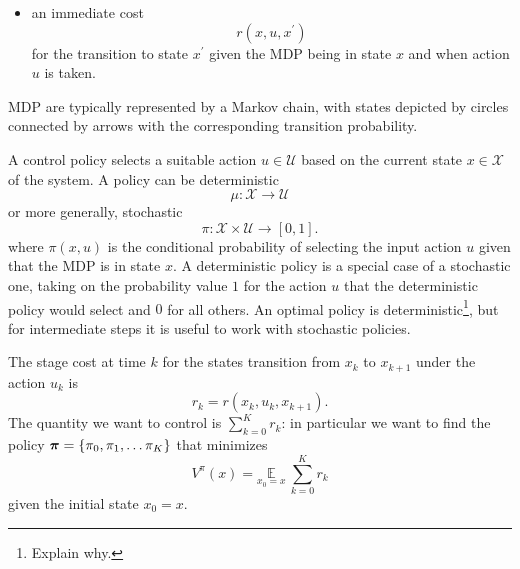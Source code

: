 \begin{itemize}
{    highlighting the quantity $r+\gamma V^\pi(x^\prime)$ similar to that in use in RL.}
  \begin{equation*}
    P : \mathcal{X}\times \mathcal{X}\times \mathcal{U} \rightarrow [0,1]
  \end{equation*}
  where
  \begin{equation*}
    P^u_{x,x^\prime} = \mathbb{P}[x^\prime |x,u]
  \end{equation*}
  is the \emph{probability} to transition to state $x^\prime$ if the MDP is in state $x$ and the input $u$ is applied. The Markov property for probabilistic systems is the extension of the definition for deterministic systems: for every $x^\prime$, the probability $P^u_{x,x\prime}$ depends only on $x$ and $u$ and not on the past system history;
\item an immediate cost
  \begin{equation*}
    r(x,u,x^\prime)
  \end{equation*}
  for the transition to state $x^\prime$ given the MDP being in state $x$ and when action $u$ is taken.
\end{itemize}
MDP are typically represented by a Markov chain, with states depicted by circles connected by arrows with the corresponding transition probability.

A control policy selects a suitable action $u\in \mathcal{U}$ based on the current state $x\in \mathcal{X}$ of the system. A policy can be deterministic
\begin{equation*}
  \mu : \mathcal{X} \rightarrow \mathcal{U}
\end{equation*}
or more generally, stochastic
\begin{equation*}
  \pi : \mathcal{X} \times \mathcal{U} \rightarrow [0,1].
\end{equation*}
where $\pi(x,u)$ is the conditional probability of selecting the input action $u$ given that the MDP is in state $x$. A deterministic policy is a special case of a stochastic one, taking on the probability value $1$ for the action $u$ that the deterministic policy would select and $0$ for all others. An optimal policy is deterministic\footnote{Explain why.}, but for intermediate steps it is useful to work with stochastic policies.

The stage cost at time $k$ for the states transition from $x_k$ to $x_{k+1}$ under the action $u_k$ is
\begin{equation*}
  r_k = r(x_k,u_k,x_{k+1}).
\end{equation*}
The quantity we want to control is $\sum_{k=0}^K r_k$: in particular we want to find the policy $\boldsymbol{\pi}=\{\pi_0,\pi_1,\ldots \pi_K\}$ that minimizes
\begin{equation*}
  V^\pi(x) = \underset{x_0=x}{\mathbb{E}}\ \sum_{k=0}^K r_k
\end{equation*}
given the initial state $x_0=x$.

